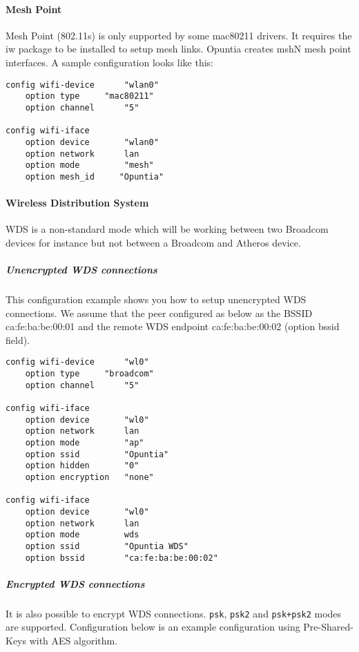 \paragraph{Mesh Point}

Mesh Point (802.11s) is only supported by some mac80211 drivers. It requires the iw package
to be installed to setup mesh links. Opuntia creates mshN mesh point interfaces. A sample
configuration looks like this:

\begin{Verbatim}
config wifi-device      "wlan0"
    option type		"mac80211"
    option channel      "5"

config wifi-iface
    option device       "wlan0"
    option network  	lan
    option mode         "mesh"
    option mesh_id     "Opuntia"
\end{Verbatim}

\paragraph{Wireless Distribution System}

WDS is a non-standard mode which will be working between two Broadcom devices for instance
but not between a Broadcom and Atheros device.

\subparagraph{Unencrypted WDS connections}

This configuration example shows you how to setup unencrypted WDS connections.
We assume that the peer configured as below as the BSSID ca:fe:ba:be:00:01
and the remote WDS endpoint ca:fe:ba:be:00:02 (option bssid field).

\begin{Verbatim}
config wifi-device      "wl0"
    option type		"broadcom"
    option channel      "5"

config wifi-iface
    option device       "wl0"
    option network  	lan
    option mode         "ap"
    option ssid         "Opuntia"
    option hidden       "0"
    option encryption   "none"

config wifi-iface
    option device       "wl0"
    option network      lan
    option mode         wds
    option ssid         "Opuntia WDS"
    option bssid        "ca:fe:ba:be:00:02"
\end{Verbatim}

\subparagraph{Encrypted WDS connections}

It is also possible to encrypt WDS connections. \texttt{psk}, \texttt{psk2} and
\texttt{psk+psk2} modes are supported. Configuration below is an example
configuration using Pre-Shared-Keys with AES algorithm.

